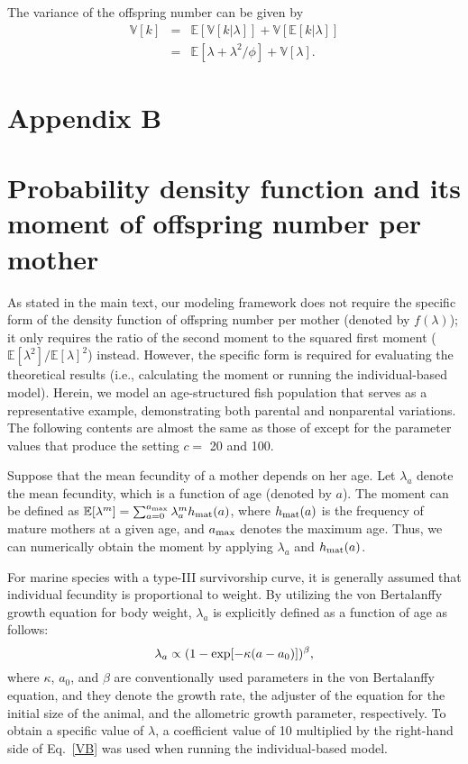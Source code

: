 \documentclass[12pt, English]{article}
\begin{document}
\begin{spacing}{1.9}
The variance of the offspring number can be given by 
\begin{eqnarray}
\mathbb{V}[k] &=& \mathbb{E}[ \mathbb{V}[k|\lambda] ] + \mathbb{V}[ \mathbb{E}[k|\lambda] ] \nonumber\\
&=& \mathbb{E}[ \lambda + \lambda^2 / \phi ] + \mathbb{V}[ \lambda ].
\label{V_k}
\end{eqnarray}

\section*{Appendix B}
\setcounter{equation}{0}
\section*{Probability density function and its moment of offspring number per mother}
\renewcommand{\theequation}{B\arabic{equation}}

As stated in the main text, our modeling framework does not require the specific form of the density function of offspring number per mother (denoted by $f(\lambda)$); it only requires the ratio of the second moment to the squared first moment ($\mathbb{E}[\lambda^2] / \mathbb{E}[\lambda]^2$) instead. However, the specific form is required for evaluating the theoretical results (i.e., calculating the moment or running the individual-based model). Herein, we model an age-structured fish population that serves as a representative example, demonstrating both parental and nonparental variations. The following contents are almost the same as those of \cite{Akita_2019} except for the parameter values that produce the setting $c=$ 20 and 100.

Suppose that the mean fecundity of a mother depends on her age. Let $\lambda_a$ denote the mean fecundity, which is a function of age (denoted by $a$). The moment can be defined as $\mathbb{E}[\lambda^m] = \sum_{a=0}^{a_{\rm max}} \lambda_a^m h_{\rm mat}(a)$, where $h_{\rm mat}(a)$ is the frequency of mature mothers at a given age, and $a_{\rm max}$ denotes the maximum age. Thus, we can numerically obtain the moment by applying $\lambda_a$ and $h_{\rm mat}(a)$. 

For marine species with a type-III survivorship curve, it is generally assumed that individual fecundity is proportional to weight. By utilizing the von Bertalanffy growth equation for body weight, $\lambda_a$ is explicitly defined as a function of age as follows:  
\begin{equation}
\lambda_a \propto ( 1-{\rm exp}[-\kappa(a-a_0)])^{\beta}, 
\label{VB}
\end{equation}
where $\kappa$, $a_0$, and $\beta$ are conventionally used parameters in the von Bertalanffy equation, and they denote the growth rate, the adjuster of the equation for the initial size of the animal, and the allometric growth parameter, respectively. To obtain a specific value of $\lambda$, a coefficient value of 10 multiplied by the right-hand side of Eq.~\ref{VB} was used when running the individual-based model. 


\end{spacing}
\end{document}
